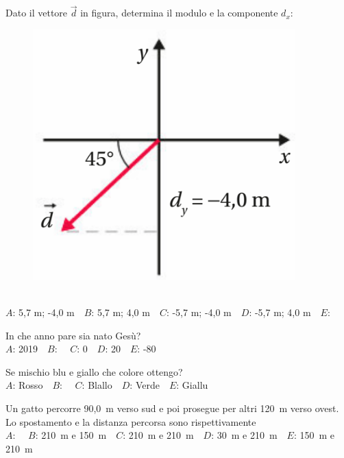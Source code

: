 \mcquestionfooter



\def\mcquestionnumber{2}


\mcquestionheader Dato il vettore $\vec{d}$ in figura, determina il modulo e la componente $d_x$: \begin{figure}[h!]   \begin{center}     \includegraphics[scale=0.35]{vettored.png}   \end{center} \end{figure}\\
{$A$}: 5,7 m; -4,0 m\ \ {$B$}: 5,7 m; 4,0 m\ \ {$C$}: -5,7 m; -4,0 m\ \ {$D$}: -5,7 m; 4,0 m\ \ {$E$}: \ \ 

\mcquestionfooter



\def\mcquestionnumber{3}


\mcquestionheader In che anno pare sia nato Gesù?\\
{$A$}: 2019\ \ {$B$}: \ \ {$C$}: 0\ \ {$D$}: 20\ \ {$E$}: -80\ \ 

\mcquestionfooter



\def\mcquestionnumber{4}


\mcquestionheader Se mischio blu e giallo che colore ottengo?\\
{$A$}: Rosso\ \ {$B$}: \ \ {$C$}: Blallo\ \ {$D$}: Verde\ \ {$E$}: Giallu\ \ 

\mcquestionfooter



\def\mcquestionnumber{5}


\mcquestionheader Un gatto percorre 90,0~m verso sud e poi prosegue per altri 120~m verso ovest. Lo spostamento e la distanza percorsa sono rispettivamente\\
{$A$}: \ \ {$B$}: 210~m e 150~m\ \ {$C$}: 210~m e 210~m\ \ {$D$}: 30~m e 210~m\ \ {$E$}: 150~m e 210~m\ \ 

